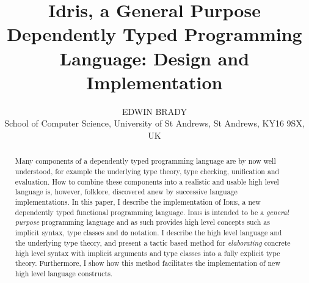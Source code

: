 \documentclass{jfp1}
\title
[Idris, a General Purpose Dependently Typed Programming Language]
{Idris, a General Purpose Dependently Typed Programming Language:
Design and Implementation}
\author[Edwin Brady]
{EDWIN BRADY\\
School of Computer Science, University of St Andrews, St Andrews,
KY16 9SX, UK}
\newcounter{per}
\newcommand{\Idris}{\textsc{Idris}}
\begin{document}
\maketitle

\begin{abstract}
Many components of a dependently typed programming language are by now well
understood, for example the underlying type theory, type checking, unification and
evaluation.  How to combine these components into a realistic and usable high
level language is, however, folklore, discovered anew by successive
language implementations.  In this paper, I describe the implementation of 
\Idris{}, a new dependently typed functional programming language.
\Idris{} is intended to be a \emph{general purpose} programming language
and as such provides high level concepts such as implicit syntax, 
type classes and \texttt{do} notation. 
I describe the high level language and the underlying type theory, and present
a tactic based method for \emph{elaborating} concrete high level syntax with
implicit arguments and type classes into a fully explicit type theory.
Furthermore, I show how this method facilitates the implementation of new high
level language constructs.

\end{abstract}







%


\end{document}
